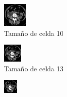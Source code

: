 \documentclass[a4paper]{article}
\begin{document}
\begin{figure}
\begin{subfigure}{0.4\linewidth}
  \centering
  \includegraphics[width=0.6\linewidth]{celdas/tomo3-10-0}
  \caption{Tamaño de celda 10}
  \label{fig:muestras_celdas_tomo3_10}
\end{subfigure}%
\begin{subfigure}{0.4\linewidth}
  \centering
  \includegraphics[width=0.6\linewidth]{celdas/tomo3-13-0}
  \caption{Tamaño de celda 13}
\end{subfigure}
\begin{subfigure}{0.4\linewidth}
  \centering
  \includegraphics[width=0.6\linewidth]{celdas/tomo3-17-0}

\end{subfigure}
\end{figure}
\end{document}
